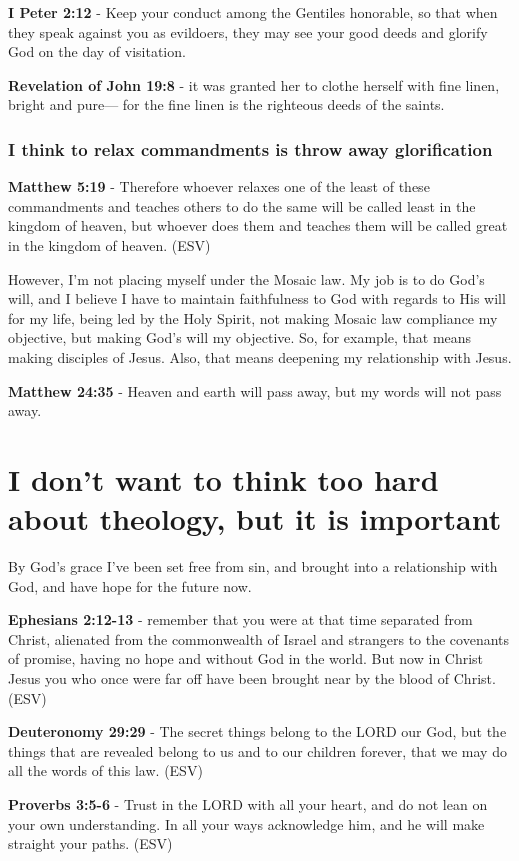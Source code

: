 \documentclass[11pt]{article}
\begin{document}
\textbf{I Peter 2:12} - Keep your conduct among the Gentiles honorable, so that when they speak against you as evildoers, they may see your good deeds and glorify God on the day of visitation.

\textbf{Revelation of John 19:8} - it was granted her to clothe herself with fine linen, bright and pure— for the fine linen is the righteous deeds of the saints.

\subsubsection{I think to relax commandments is throw away glorification}
\label{sec:org173236e}
\textbf{Matthew 5:19} - Therefore whoever relaxes one of the least of these commandments and teaches others to do the same will be called least in the kingdom of heaven, but whoever does them and teaches them will be called great in the kingdom of heaven. (ESV)

However, I'm not placing myself under the Mosaic law.
My job is to do God's will, and I believe I have to maintain faithfulness to God with regards to His will for my life,
being led by the Holy Spirit, not making Mosaic law compliance my objective, but making God's will my objective.
So, for example, that means making disciples of Jesus.
Also, that means deepening my relationship with Jesus.

\textbf{Matthew 24:35} - Heaven and earth will pass away, but my words will not pass away.

\section{I don't want to think too hard about theology, but it is important}
\label{sec:orgee98160}
By God's grace I've been set free from sin, and brought into a relationship with God, and have hope for the future now.

\textbf{Ephesians 2:12-13} -  remember that you were at that time separated from Christ, alienated from the commonwealth of Israel and strangers to the covenants of promise, having no hope and without God in the world.  But now in Christ Jesus you who once were far off have been brought near by the blood of Christ.  (ESV)

\textbf{Deuteronomy 29:29} -  The secret things belong to the LORD our God, but the things that are revealed belong to us and to our children forever, that we may do all the words of this law.  (ESV)

\textbf{Proverbs 3:5-6} - Trust in the LORD with all your heart, and do not lean on your own understanding. In all your ways acknowledge him, and he will make straight your paths. (ESV)
\end{document}

